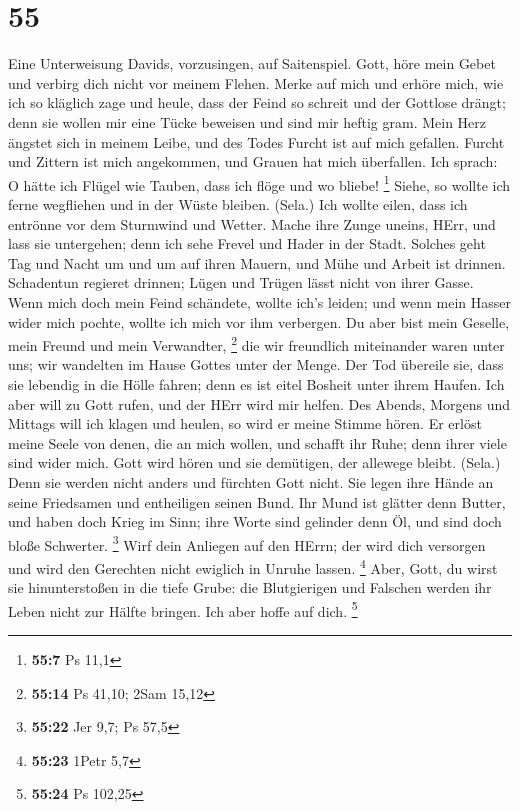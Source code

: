 \hypertarget{section-54}{%
\section{55}\label{section-54}}

 Eine Unterweisung Davids, vorzusingen, auf Saitenspiel.
 Gott, höre mein Gebet und verbirg dich nicht vor meinem
Flehen.  Merke auf mich und erhöre mich, wie ich so
kläglich zage und heule,  dass der Feind so schreit und
der Gottlose drängt; denn sie wollen mir eine Tücke beweisen und sind
mir heftig gram.  Mein Herz ängstet sich in meinem Leibe,
und des Todes Furcht ist auf mich gefallen.  Furcht und
Zittern ist mich angekommen, und Grauen hat mich überfallen.
 Ich sprach: O hätte ich Flügel wie Tauben, dass ich flöge
und wo bliebe! \footnote{\textbf{55:7} Ps 11,1}  Siehe, so
wollte ich ferne wegfliehen und in der Wüste bleiben. (Sela.)
 Ich wollte eilen, dass ich entrönne vor dem Sturmwind und
Wetter.  Mache ihre Zunge uneins, HErr, und lass sie
untergehen; denn ich sehe Frevel und Hader in der Stadt. 
Solches geht Tag und Nacht um und um auf ihren Mauern, und Mühe und
Arbeit ist drinnen.  Schadentun regieret drinnen; Lügen
und Trügen lässt nicht von ihrer Gasse.  Wenn mich doch
mein Feind schändete, wollte ich's leiden; und wenn mein Hasser wider
mich pochte, wollte ich mich vor ihm verbergen.  Du aber
bist mein Geselle, mein Freund und mein Verwandter, \footnote{\textbf{55:14}
  Ps 41,10; 2Sam 15,12}  die wir freundlich miteinander
waren unter uns; wir wandelten im Hause Gottes unter der Menge.
 Der Tod übereile sie, dass sie lebendig in die Hölle
fahren; denn es ist eitel Bosheit unter ihrem Haufen. 
Ich aber will zu Gott rufen, und der HErr wird mir helfen.
 Des Abends, Morgens und Mittags will ich klagen und
heulen, so wird er meine Stimme hören.  Er erlöst meine
Seele von denen, die an mich wollen, und schafft ihr Ruhe; denn ihrer
viele sind wider mich.  Gott wird hören und sie
demütigen, der allewege bleibt. (Sela.) Denn sie werden nicht anders und
fürchten Gott nicht.  Sie legen ihre Hände an seine
Friedsamen und entheiligen seinen Bund.  Ihr Mund ist
glätter denn Butter, und haben doch Krieg im Sinn; ihre Worte sind
gelinder denn Öl, und sind doch bloße Schwerter. \footnote{\textbf{55:22}
  Jer 9,7; Ps 57,5}  Wirf dein Anliegen auf den HErrn;
der wird dich versorgen und wird den Gerechten nicht ewiglich in Unruhe
lassen. \footnote{\textbf{55:23} 1Petr 5,7}  Aber, Gott,
du wirst sie hinunterstoßen in die tiefe Grube: die Blutgierigen und
Falschen werden ihr Leben nicht zur Hälfte bringen. Ich aber hoffe auf
dich. \footnote{\textbf{55:24} Ps 102,25}

